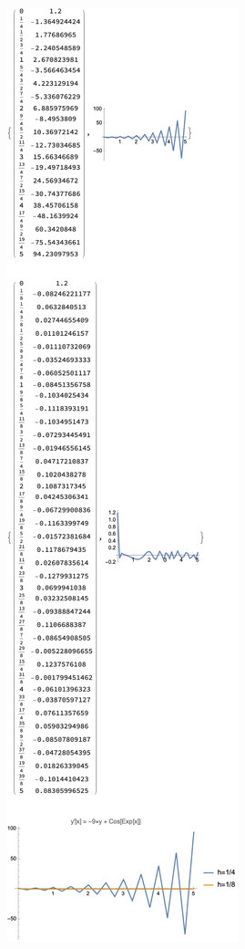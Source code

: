 \documentclass[10pt,twoside,openany]{memoir}
\begin{document}
\begin{mdframed}
\begin{solution}
\includegraphics[scale=0.4]{final_q3}
    \end{solution}
    \end{mdframed}
\end{document}
